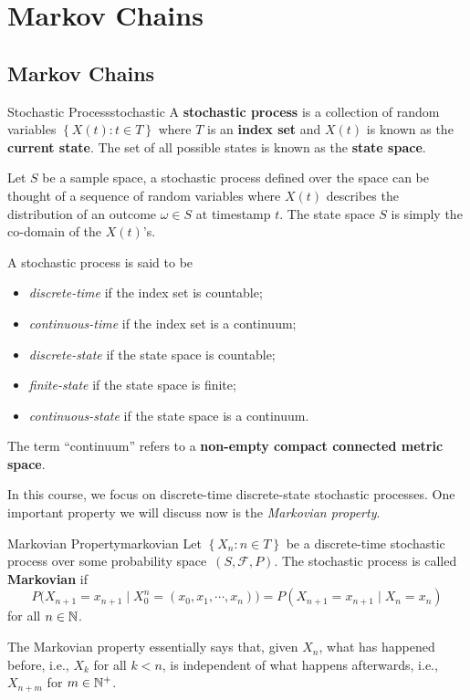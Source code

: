 \documentclass[math, code]{amznotes}
\theoremstyle{remark}
\begin{document}
\chapter{Markov Chains}
\section{Markov Chains}
\begin{dfnbox}{Stochastic Process}{stochastic}
    A {\color{red} \textbf{stochastic process}} is a collection of random variables $\left\{X\left(t\right) \colon t \in T\right\}$ where $T$ is an {\color{red} \textbf{index set}} and $X\left(t\right)$ is known as the {\color{red} \textbf{current state}}. The set of all possible states is known as the {\color{red} \textbf{state space}}.
\end{dfnbox}
Let $S$ be a sample space, a stochastic process defined over the space can be thought of a sequence of random variables where $X\left(t\right)$ describes the distribution of an outcome $\omega \in S$ at timestamp $t$. The state space $S$ is simply the co-domain of the $X\left(t\right)$'s.

A stochastic process is said to be 
\begin{itemize}
    \item \textit{discrete-time} if the index set is countable;
    \item \textit{continuous-time} if the index set is a continuum;
    \item \textit{discrete-state} if the state space is countable;
    \item \textit{finite-state} if the state space is finite;
    \item \textit{continuous-state} if the state space is a continuum.
\end{itemize}
The term ``continuum'' refers to a \textbf{non-empty compact connected metric space}. 

In this course, we focus on discrete-time discrete-state stochastic processes. One important property we will discuss now is the \textit{Markovian property}.
\begin{dfnbox}{Markovian Property}{markovian}
    Let $\left\{X_n \colon n \in T\right\}$ be a discrete-time stochastic process over some probability space~$\left(S, \mathcal{F}, P\right)$. The stochastic process is called {\color{red} \textbf{Markovian}} if 
    \begin{equation*}
        P\bigl(X_{n + 1} = x_{n + 1} \mid X_0^n = \left(x_0, x_1, \cdots, x_n\right)\bigr) = P\left(X_{n + 1} = x_{n + 1} \mid X_n = x_n\right)
    \end{equation*}
    for all $n \in \mathbb{N}$.
\end{dfnbox}
The Markovian property essentially says that, given $X_n$, what has happened before, i.e., $X_k$ for all $k < n$, is independent of what happens afterwards, i.e., $X_{n + m}$ for $m \in \mathbb{N}^+$.
\end{document}
